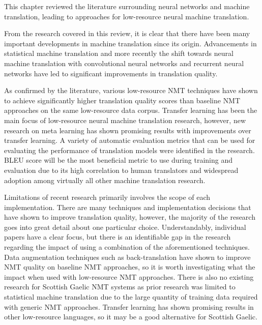 This chapter reviewed the literature surrounding neural networks and machine translation, leading to approaches for low-resource neural machine translation. 

From the research covered in this review, it is clear that there have been many important developments in machine translation since its origin. Advancements in statistical machine translation and more recently the shift towards neural machine translation with convolutional neural networks and recurrent neural networks have led to significant improvements in translation quality.

As confirmed by the literature, various low-resource \acrshort{NMT} techniques have shown to achieve significantly higher translation quality scores than baseline \acrshort{NMT} approaches on the same low-resource data corpus. Transfer learning has been the main focus of low-resource neural machine translation research, however, new research on meta learning has shown promising results with improvements over transfer learning. A variety of automatic evaluation metrics that can be used for evaluating the performance of translation models were identified in the research. \acrshort{BLEU} score will be the most beneficial metric to use during training and evaluation due to its high correlation to human translators and widespread adoption among virtually all other machine translation research.

Limitations of recent research primarily involves the scope of each implementation. There are many techniques and implementation decisions that have shown to improve translation quality, however, the majority of the research goes into great detail about one particular choice. Understandably, individual papers have a clear focus, but there is an identifiable gap in the research regarding the impact of using a combination of the aforementioned techniques. Data augmentation techniques such as back-translation have shown to improve \acrshort{NMT} quality on baseline \acrshort{NMT} approaches, so it is worth investigating what the impact when used with low-resource \acrshort{NMT} approaches. There is also no existing research for Scottish Gaelic \acrshort{NMT} systems as prior research was limited to statistical machine translation due to the large quantity of training data required with generic \acrshort{NMT} approaches. Transfer learning has shown promising results in other low-resource languages, so it may be a good alternative for Scottish Gaelic.



